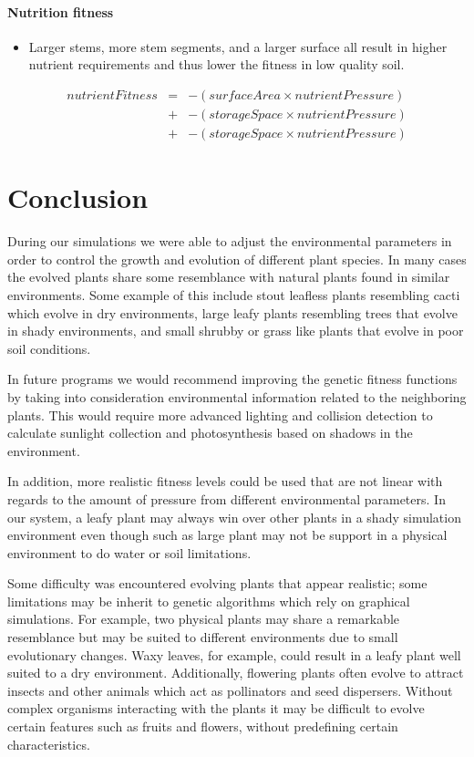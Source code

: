\documentclass[conference]{acmsiggraph}
\begin{document}
\paragraph{Nutrition fitness}
\begin{itemize}
  \item Larger stems, more stem segments, and a larger surface all result in
    higher nutrient requirements and thus lower the fitness in low quality soil.
\end{itemize}
\vspace{-0.5em}
\begin{eqnarray*}
nutrientFitness &=&-(surfaceArea \times nutrientPressure) \\
                &+&-(storageSpace \times nutrientPressure) \\
                &+&-(storageSpace \times nutrientPressure)
\end{eqnarray*}

\section{Conclusion}

During our simulations we were able to adjust the environmental parameters in
order to control the growth and evolution of different plant species. In many
cases the evolved plants share some resemblance with natural plants found in
similar environments. Some example of this include stout leafless plants
resembling cacti which evolve in dry environments, large leafy plants resembling
trees that evolve in shady environments, and small shrubby or grass like plants
that evolve in poor soil conditions.

In future programs we would recommend improving the genetic fitness functions by
taking into consideration environmental information related to the neighboring
plants. This would require more advanced lighting and collision detection to
calculate sunlight collection and photosynthesis based on shadows in the
environment.

In addition, more realistic fitness levels could be used that are not linear
with regards to the amount of pressure from different environmental parameters.
In our system, a leafy plant may always win over other plants in a shady
simulation environment even though such as large plant may not be support in a
physical environment to do water or soil limitations.

Some difficulty was encountered evolving plants that appear realistic; some
limitations may be inherit to genetic algorithms which rely on graphical
simulations. For example, two physical plants may share a remarkable resemblance
but may be suited to different environments due to small evolutionary changes.
Waxy leaves, for example, could result in a leafy plant well suited to a dry
environment. Additionally, flowering plants often evolve to attract insects and
other animals which act as pollinators and seed dispersers. Without complex
organisms interacting with the plants it may be difficult to evolve certain
features such as fruits and flowers, without predefining certain
characteristics.
\end{document}
